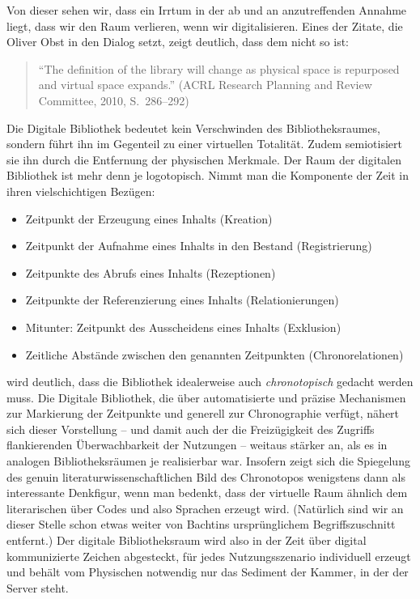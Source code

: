 \documentclass[output=paper]{langscibook}
\begin{document}
Von dieser sehen wir, dass ein Irrtum in der ab und an anzutreffenden
Annahme liegt, dass wir den Raum verlieren, wenn wir digitalisieren.
Eines der Zitate, die Oliver Obst in den Dialog setzt, zeigt deutlich,
dass dem nicht so ist:

\begin{quote}
\enquote{The definition of the library will change as physical space is
repurposed and virtual space expands.} (ACRL Research Planning and Review Committee, 2010, S.~286--292)
\end{quote}

\noindent Die Digitale Bibliothek bedeutet kein Verschwinden des
Bibliotheksraumes, sondern führt ihn im Gegenteil zu einer virtuellen
Totalität. Zudem semiotisiert sie ihn durch die Entfernung der
physischen Merkmale. Der Raum der digitalen Bibliothek ist mehr denn je
logotopisch. Nimmt man die Komponente der Zeit in ihren vielschichtigen
Bezügen:

\begin{itemize}
\item
  Zeitpunkt der Erzeugung eines Inhalts (Kreation)
\item
  Zeitpunkt der Aufnahme eines Inhalts in den Bestand (Registrierung)
\item
  Zeitpunkte des Abrufs eines Inhalts (Rezeptionen)
\item
  Zeitpunkte der Referenzierung eines Inhalts (Relationierungen)
\item
  Mitunter: Zeitpunkt des Ausscheidens eines Inhalts (Exklusion)
\item
  Zeitliche Abstände zwischen den genannten Zeitpunkten
  (Chronorelationen)
\end{itemize}

\noindent wird deutlich, dass die Bibliothek idealerweise auch
\emph{chronotopisch} gedacht werden muss. Die Digitale Bibliothek, die
über automatisierte und präzise Mechanismen zur Markierung der
Zeitpunkte und generell zur Chronographie verfügt, nähert sich dieser
Vorstellung -- und damit auch der die Freizügigkeit des Zugriffs
flankierenden Überwachbarkeit der Nutzungen -- weitaus stärker an, als
es in analogen Bibliotheksräumen je realisierbar war. Insofern zeigt
sich die Spiegelung des genuin literaturwissenschaftlichen Bild des
Chronotopos wenigstens dann als interessante Denkfigur, wenn man
bedenkt, dass der virtuelle Raum ähnlich dem literarischen über Codes
und also Sprachen erzeugt wird. (Natürlich sind wir an dieser Stelle
schon etwas weiter von Bachtins ursprünglichem Begriffszuschnitt
entfernt.) Der digitale Bibliotheksraum wird also in der Zeit über
digital kommunizierte Zeichen abgesteckt, für jedes Nutzungsszenario
individuell erzeugt und behält vom Physischen notwendig nur das Sediment
der Kammer, in der der Server steht.
\end{document}
